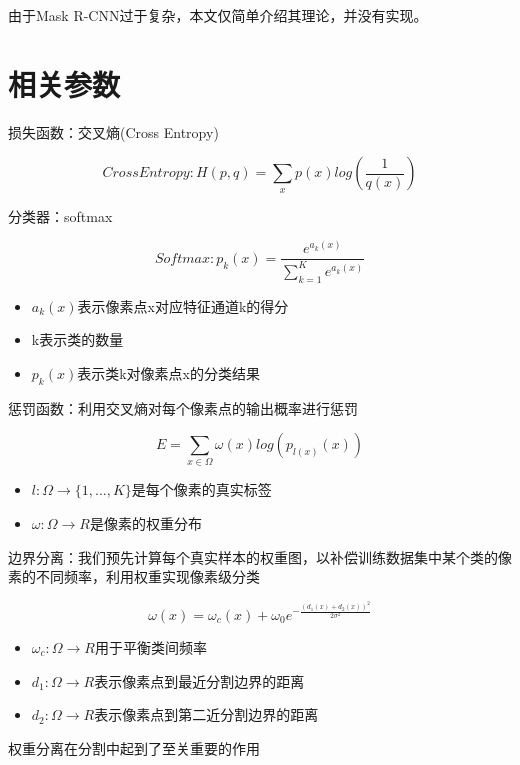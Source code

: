 由于Mask R-CNN过于复杂，本文仅简单介绍其理论，并没有实现。

\section{相关参数}\label{ux76f8ux5173ux53c2ux6570}

损失函数：交叉熵(Cross Entropy)

\[Cross Entropy: H(p, q) = \sum_xp(x)log(\frac{1}{q(x)})\]

分类器：softmax

\[Softmax: p_k(x) = \frac{e^{a_k(x)}}{\sum^K_{k=1}e^{a_k(x)}}\]

\begin{itemize}
\tightlist
\item
  \(a_k(x)\)表示像素点x对应特征通道k的得分
\item
  k表示类的数量
\item
  \(p_k(x)\)表示类k对像素点x的分类结果
\end{itemize}

惩罚函数：利用交叉熵对每个像素点的输出概率进行惩罚

\[E = \sum_{x\in\Omega}\omega(x)log(p_{l(x)}(x))\]

\begin{itemize}
\tightlist
\item
  \(l: \Omega\longrightarrow\{1, …, K\}\)是每个像素的真实标签
\item
  \(\omega: \Omega\longrightarrow R\)是像素的权重分布
\end{itemize}

边界分离：我们预先计算每个真实样本的权重图，以补偿训练数据集中某个类的像素的不同频率，利用权重实现像素级分类

\[\omega(x) = \omega_c(x)+\omega_0e^{-\frac{(d_1(x)+d_2(x))^2}{2\sigma^2}}\]

\begin{itemize}
\tightlist
\item
  \(\omega_c: \Omega\longrightarrow R\)用于平衡类间频率
\item
  \(d_1: \Omega\longrightarrow R\)表示像素点到最近分割边界的距离
\item
  \(d_2: \Omega\longrightarrow R\)表示像素点到第二近分割边界的距离
\end{itemize}

权重分离在分割中起到了至关重要的作用
